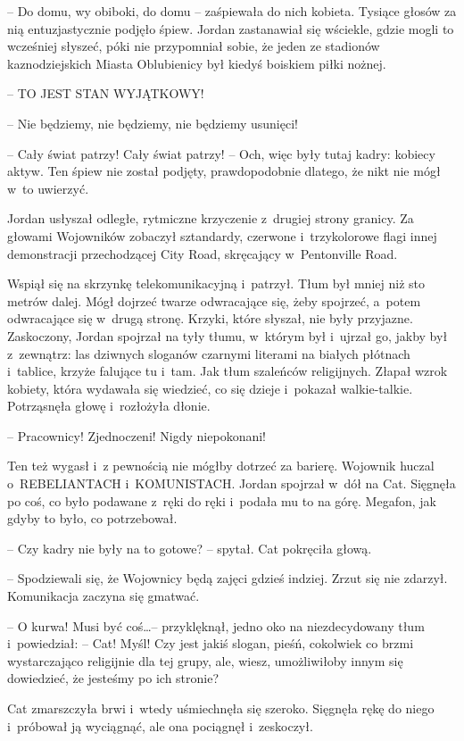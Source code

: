 \documentclass[oneside,polish,11pt,sfheadings]{mwbk}
\begin{document}
-- Do domu, wy obiboki, do domu -- zaśpiewała do nich kobieta. Tysiące
głosów za nią entuzjastycznie podjęło śpiew. Jordan zastanawiał się
wściekle, gdzie mogli to wcześniej słyszeć, póki nie przypomniał sobie,
że jeden ze stadionów kaznodziejskich Miasta Oblubienicy był kiedyś
boiskiem piłki nożnej.

-- TO JEST STAN WYJĄTKOWY!

-- Nie będziemy, nie będziemy, nie będziemy usunięci!

-- Cały świat patrzy! Cały świat patrzy! -- Och, więc były tutaj kadry:
kobiecy aktyw. Ten śpiew nie został podjęty, prawdopodobnie dlatego, że
nikt nie mógł w~to uwierzyć.

Jordan usłyszał odległe, rytmiczne krzyczenie z~drugiej strony granicy.
Za głowami Wojowników zobaczył sztandardy, czerwone i~trzykolorowe flagi
innej demonstracji przechodzącej City Road, skręcający w~Pentonville
Road.

Wspiął się na skrzynkę telekomunikacyjną i~patrzył. Tłum był mniej niż
sto metrów dalej. Mógł dojrzeć twarze odwracające się, żeby spojrzeć, a~potem odwracające się w~drugą stronę. Krzyki, które słyszał, nie były
przyjazne. Zaskoczony, Jordan spojrzał na tyły tłumu, w~którym był i~ujrzał go, jakby był z~zewnątrz: las dziwnych sloganów czarnymi literami
na białych płótnach i~tablice, krzyże falujące tu i~tam. Jak tłum
szaleńców religijnych. Złapał wzrok kobiety, która wydawała się
wiedzieć, co się dzieje i~pokazał walkie-talkie. Potrząsnęła głowę i~rozłożyła dłonie.

-- Pracownicy! Zjednoczeni! Nigdy niepokonani!

Ten też wygasł i~z pewnością nie mógłby dotrzeć za barierę. Wojownik
huczal o~REBELIANTACH i~KOMUNISTACH. Jordan spojrzał w~dół na Cat.
Sięgnęła po coś, co było podawane z~ręki do ręki i~podała mu to na górę.
Megafon, jak gdyby to było, co potrzebował.

-- Czy kadry nie były na to gotowe? -- spytał. Cat pokręciła głową.

-- Spodziewali się, że Wojownicy będą zajęci gdzieś indziej. Zrzut się
nie zdarzył. Komunikacja zaczyna się gmatwać.

-- O kurwa! Musi być coś\ldots -- przyklęknął, jedno oko na niezdecydowany
tłum i~powiedział: -- Cat! Myśl! Czy jest jakiś slogan, pieśń, cokolwiek
co brzmi wystarczająco religijnie dla tej grupy, ale, wiesz,
umożliwiłoby innym się dowiedzieć, że jesteśmy po ich stronie?

Cat zmarszczyła brwi i~wtedy uśmiechnęła się szeroko. Sięgnęła rękę do
niego i~próbował ją wyciągnąć, ale ona pociągnęł i~zeskoczył. 
\end{document}
